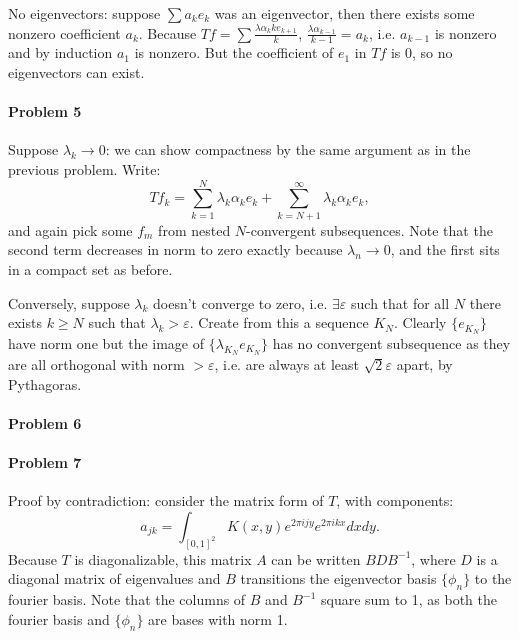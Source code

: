 \documentclass[12pt]{article}
\begin{document}
No eigenvectors: suppose $\sum a_ke_k$ was an eigenvector, then there exists
some nonzero coefficient $a_k$. Because $Tf = \sum \frac{\lambda \alpha_{k}{k}
  e_{k+1}}{k}$, $\frac{\lambda\alpha_{k-1}}{k-1} = a_k$, i.e. $a_{k-1}$ is
nonzero and by induction $a_1$ is nonzero. But the coefficient of $e_1$ in $Tf$
is 0, so no eigenvectors can exist.



\paragraph{Problem 5}

Suppose $\lambda_k \to 0$: we can show compactness by the same argument as in
the previous problem. Write:
\begin{displaymath}
  Tf_k = \sum_{k=1}^N\lambda_k\alpha_ke_k + \sum_{k=N+1}^\infty\lambda_k\alpha_ke_k,
\end{displaymath}
and again pick some $f_m$ from nested $N$-convergent subsequences. Note that
the second term decreases in norm to zero exactly because $\lambda_n\to 0$, and
the first sits in a compact set as before.

Conversely, suppose $\lambda_k$ doesn't converge to zero, i.e. $\exists
\varepsilon$ such that for all $N$ there exists $k \geq N$ such that $\lambda_k
> \varepsilon$. Create from this a sequence $K_N$. Clearly $\{e_{K_N}\}$ have
norm one but the image of $\{\lambda_{K_N}e_{K_N}\}$ has no convergent
subsequence
as they are all orthogonal with norm $> \varepsilon$, i.e. are always at least
$\sqrt{2}\varepsilon$ apart, by Pythagoras.

\paragraph{Problem 6}


\paragraph{Problem 7}

Proof by contradiction: consider the matrix form of $T$, with components:
\begin{displaymath}
  a_{jk} = \int_{[0,1]^2}K(x,y)e^{2\pi ijy}e^{2\pi i kx}dxdy.
\end{displaymath}
Because $T$ is diagonalizable, this matrix $A$ can be written $BDB^{-1}$, where
$D$ is a diagonal matrix of eigenvalues and $B$ transitions the eigenvector basis
$\{\phi_n\}$ to the fourier basis. Note that the columns of $B$ and $B^{-1}$ square
sum to 1, as both the fourier basis and $\{\phi_n\}$ are bases with norm 1.
\end{document}
